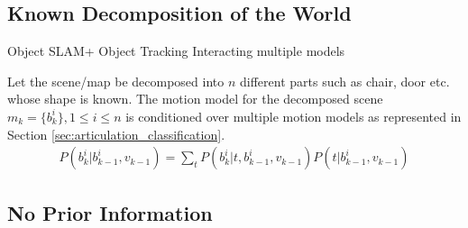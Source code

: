\documentclass[conference]{IEEEtran}
\begin{document}
\subsection{Known Decomposition of the World} Object SLAM+ Object Tracking Interacting multiple models

Let the scene/map be decomposed into $n$ different parts such as chair, door etc. whose shape is known.
The motion model for the decomposed scene $m_k = \{b^i_k\},  1\leq i \leq n$ is conditioned over multiple motion models as represented in Section \ref{sec:articulation_classification}.
\begin{align}
P(b^i_k|b^i_{k-1},v_{k-1}) = \sum_{t} P(b^i_k|t,b^i_{k-1},v_{k-1})P(t|b^i_{k-1},v_{k-1}) 
\end{align}

\subsection{No Prior Information}




\end{document}
